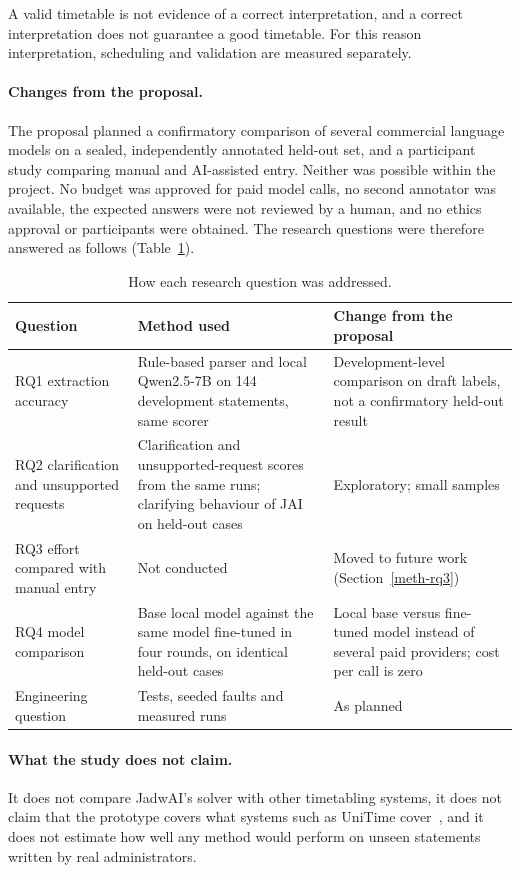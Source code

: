A valid timetable is not evidence of a correct interpretation, and a correct interpretation does not guarantee a good timetable. For this reason interpretation, scheduling and validation are measured separately.

\paragraph{Changes from the proposal.} The proposal planned a confirmatory comparison of several commercial language models on a sealed, independently annotated held-out set, and a participant study comparing manual and AI-assisted entry. Neither was possible within the project. No budget was approved for paid model calls, no second annotator was available, the expected answers were not reviewed by a human, and no ethics approval or participants were obtained. The research questions were therefore answered as follows (Table~\ref{tab:rq-method}).

\begin{table}[h]
\centering
\small
\begin{tabular}{@{}p{}p{}p{}@{}}
\toprule
Question & Method used & Change from the proposal \\
\midrule
RQ1 extraction accuracy & Rule-based parser and local Qwen2.5-7B on 144 development statements, same scorer & Development-level comparison on draft labels, not a confirmatory held-out result \\
RQ2 clarification and unsupported requests & Clarification and unsupported-request scores from the same runs; clarifying behaviour of JAI on held-out cases & Exploratory; small samples \\
RQ3 effort compared with manual entry & Not conducted & Moved to future work (Section~\ref{meth-rq3}) \\
RQ4 model comparison & Base local model against the same model fine-tuned in four rounds, on identical held-out cases & Local base versus fine-tuned model instead of several paid providers; cost per call is zero \\
Engineering question & Tests, seeded faults and measured runs & As planned \\
\bottomrule
\end{tabular}
\caption{How each research question was addressed.}
\label{tab:rq-method}
\end{table}

\paragraph{What the study does not claim.} It does not compare JadwAI's solver with other timetabling systems, it does not claim that the prototype covers what systems such as UniTime cover~\cite{muller2025itc}, and it does not estimate how well any method would perform on unseen statements written by real administrators.

